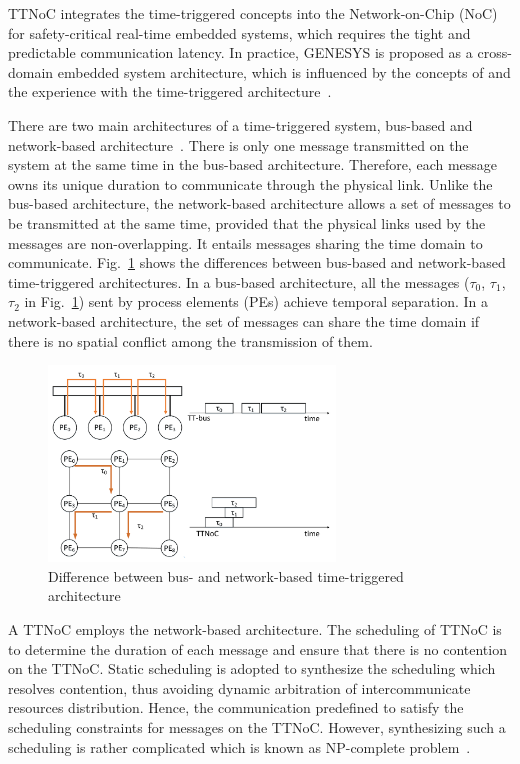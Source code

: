 \documentclass[journal]{IEEEtran}
\theoremstyle{remark}
\begin{document}
TTNoC integrates the time-triggered concepts into the Network-on-Chip (NoC) for safety-critical real-time embedded systems, which requires the tight and predictable communication latency.
In practice,
 GENESYS is proposed as a cross-domain embedded system architecture,
  which is influenced by the concepts of and the experience with the time-triggered architecture~\cite{DBLP:conf/ladc/Kopetz11}.

There are two main architectures of a time-triggered system,
 bus-based and network-based architecture~\cite{DBLP:conf/date/HuangBRBK12}.
There is only one message transmitted on the system at the same time in the bus-based architecture. 
Therefore,
 each message owns its unique duration to communicate through the physical link.
Unlike the bus-based architecture,
 the network-based architecture allows a set of messages to be transmitted at the same time,
 provided that the physical links used by the messages are non-overlapping.
It entails messages sharing the time domain to communicate.
Fig.~\ref{f:diff} shows the differences between bus-based and network-based time-triggered architectures.
In a bus-based architecture,
 all the messages ($\tau_0$, $\tau_1$, $\tau_2$ in Fig.~\ref{f:diff}) sent by process elements (PEs) achieve temporal separation. 
In a network-based architecture,
 the set of messages can share the time domain if there is no spatial conflict among the transmission of them.
\begin{figure}[!t]
	\centering
	\includegraphics[width=3in]{picture/difference.pdf}
	\caption{Difference between bus- and network-based time-triggered architecture}
	\label{f:diff}
\end{figure}

A TTNoC employs the network-based architecture.
The scheduling of TTNoC is to determine the duration of each message and ensure that there is no contention on the TTNoC. 
Static scheduling is adopted to synthesize the scheduling which resolves contention,
thus avoiding dynamic arbitration of intercommunicate resources distribution. 
Hence, the communication predefined to satisfy the scheduling constraints for messages on the TTNoC.
However,
 synthesizing such a scheduling is rather complicated which is known as NP-complete problem~\cite{DBLP:conf/date/HuangBRBK12,DBLP:conf/rtss/Steiner10}.
\end{document}
